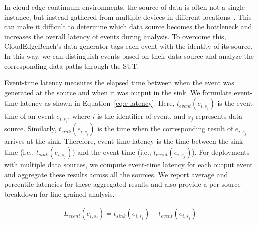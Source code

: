 \documentclass[runningheads]{llncs}
\begin{document}
In cloud-edge continuum environments, the source of data is often not a single instance, but instead gathered from multiple devices in different locations~\cite{sec-survey}.
This can make it difficult to determine which data source becomes the bottleneck and increases the overall latency of events during analysis.
To overcome this, CloudEdgeBench's data generator tags each event with the identity of its source. 
In this way, we can distinguish events based on their data source and analyze the corresponding data paths through the SUT.

Event-time latency measures the elapsed time between when the event was generated at the source and when it was output in the sink.
We formulate event-time latency as shown in Equation~\ref{eq:e-latency}.
Here, $t_{event}(e_{i,s_j})$ is the event time of an event $e_{i,s_j}$, where $i$ is the identifier of event, and $s_j$ represents data source.
Similarly, $t_{sink}(e_{i,s_j})$ is the time when the corresponding result of $e_{i,s_j}$ arrives at the sink.
Therefore, event-time latency is the time between the sink time (i.e., $t_{sink}(e_{i,s_j})$) and the event time (i.e., $t_{event}(e_{i,s_j})$).
For deployments with multiple data sources, we compute event-time latency for each output event and aggregate these results across all the sources.
We report average and percentile latencies for these aggregated results and also provide a per-source breakdown for fine-grained analysis.


\begin{equation} \label{eq:e-latency}
\begin{split}
    L_{event}(e_{i,s_j}) = t_{sink}(e_{i,s_j}) - t_{event}(e_{i,s_j}) \\
\end{split}
\end{equation}

\end{document}
